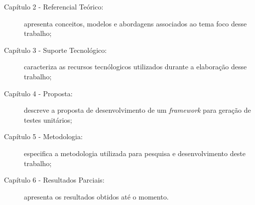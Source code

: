 	\begin{description}
		\item[Capítulo 2 - Referencial Teórico:] apresenta conceitos, modelos e abordagens associados ao tema foco desse trabalho;
		\item[Capítulo 3 - Suporte Tecnológico:] caracteriza as recursos tecnólogicos utilizados durante a elaboração desse trabalho;
		\item[Capítulo 4 - Proposta:] descreve a proposta de desenvolvimento de um \textit{framework} para geração de testes unitários;
		\item[Capítulo 5 - Metodologia:] especifica a metodologia utilizada para pesquisa e desenvolvimento deste trabalho;
		\item[Capítulo 6 - Resultados Parciais:] apresenta os resultados obtidos até o momento.
	\end{description}